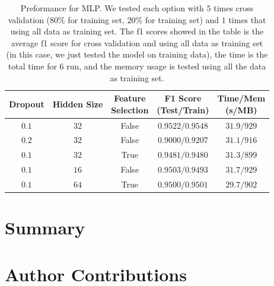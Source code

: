 \documentclass[11pt]{article}
\renewcommand\thesection{\arabic{section}}
\begin{document}
\begin{table}[H]
  \centering
  \begin{tabular}{|c|c|c|c|c|}
    \hline
    Dropout & Hidden Size & \makecell{Feature                                \\ Selection} & \makecell{F1 Score \\ (Test/Train)} & \makecell{Time/Mem \\ (s/MB)} \\
    \hline
    $0.1$   & $32$        & False             & $0.9522/0.9548$ & $31.9/929$ \\
    \hline
    $0.2$   & $32$        & False             & $0.9000/0.9207$ & $31.1/916$ \\
    \hline
    $0.1$   & $32$        & True              & $0.9481/0.9480$ & $31.3/899$ \\
    \hline
    $0.1$   & $16$        & False             & $0.9503/0.9493$ & $31.7/929$ \\
    \hline
    $0.1$   & $64$        & True              & $0.9500/0.9501$ & $29.7/902$ \\
    \hline
  \end{tabular}
  \caption{Preformance for MLP. We tested each option with $5$ times cross validation ($80\%$ for training set, $20\%$ for training set) and $1$ times that using all data as training set. The f1 scores showed in the table is the average f1 score for cross validation and using all data as training set (in this case, we just tested the model on training data), the time is the total time for $6$ run, and the memory usage is tested using all the data as training set.}
  \label{task-3-result-2}
\end{table}

\section{Summary}

\newpage




\newpage

\appendix
\renewcommand\thesection{\Alph{section}}

\section{Author Contributions}

\end{document}
